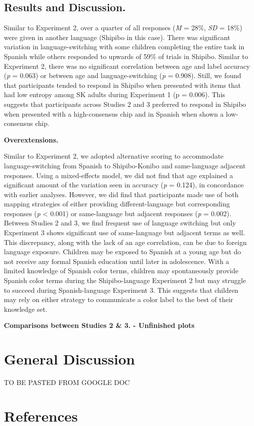 \documentclass[floatsintext,man]{apa6}
\theoremstyle{definition}
\theoremstyle{definition}
\theoremstyle{definition}
\theoremstyle{remark}
\begin{document}
\subsection{Results and Discussion.}\label{results-and-discussion.}

Similar to Experiment 2, over a quarter of all responses (\emph{M} =
28\%, \emph{SD} = 18\%) were given in another language (Shipibo in this
case). There was significant variation in language-switching with some
children completing the entire task in Spanish while others responded to
upwards of 59\% of trials in Shipibo. Similar to Experiment 2, there was
no significant correlation between age and label accuracy (\emph{p} =
0.063) or between age and language-switching (\emph{p} = 0.908). Still,
we found that participants tended to respond in Shipibo when presented
with items that had low entropy among SK adults during Experiment 1 (p =
0.006). This suggests that participants across Studies 2 and 3 preferred
to respond in Shipibo when presented with a high-consensus chip and in
Spanish when shown a low-consensus chip.

\textbf{Overextensions.}

Similar to Experiment 2, we adopted alternative scoring to accommodate
language-switching from Spanish to Shipibo-Konibo and same-language
adjacent responses. Using a mixed-effects model, we did not find that
age explained a significant amount of the variation seen in accuracy
(\emph{p} = 0.124), in concordance with earlier analyses. However, we
did find that participants made use of both mapping strategies of either
providing different-language but corresponding responses (\emph{p}
\textless{} 0.001) or same-language but adjacent responses (\emph{p} =
0.002). Between Studies 2 and 3, we find frequent use of language
switching but only Experiment 3 shows significant use of same-language
but adjacent terms as well. This discrepancy, along with the lack of an
age correlation, can be due to foreign language exposure. Children may
be exposed to Spanish at a young age but do not receive any formal
Spanish education until later in adolescence. With a limited knowledge
of Spanish color terms, children may spontaneously provide Spanish color
terms during the Shipibo-language Experiment 2 but may struggle to
succeed during Spanish-language Experiment 3. This suggests that
children may rely on either strategy to communicate a color label to the
best of their knowledge set.

\textbf{Comparisons between Studies 2 \& 3. - Unfinished plots}

\section{General Discussion}\label{general-discussion}

TO BE PASTED FROM GOOGLE DOC

\newpage

\section{References}\label{references}

\begingroup
\setlength{\parindent}{-0.5in} \setlength{\leftskip}{0.5in}

\hypertarget{refs}{}

\endgroup
\end{document}
